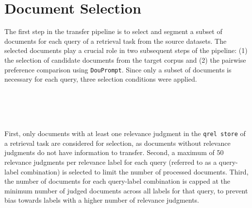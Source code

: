 \section{Document Selection}\label{eval-doucment-selection}

The first step in the transfer pipeline is to select and segment a subset of documents for each query of a retrieval task from the source datasets. The selected documents play a crucial role in two subsequent steps of the pipeline: (1) the selection of candidate documents from the target corpus and (2) the pairwise preference comparison using \texttt{DouPrompt}. Since only a subset of documents is necessary for each query, three selection conditions were applied.
\begin{table}[t]
  \centering
  \caption{The table presents the results of the candidate selection process, showing the minimum (min), maximum (max), and average (mean) number of documents per query for each source dataset. A maximum of 50 documents per query is possible.}
  \label{tab:document-selection}
\end{table}
\\\\\\\\
First, only documents with at least one relevance judgment in the \texttt{qrel store} of a retrieval task are considered for selection, as documents without relevance judgments do not have information to transfer. Second, a maximum of 50 relevance judgments per relevance label for each query (referred to as a query-label combination) is selected to limit the number of processed documents. Third, the number of documents for each query-label combination is capped at the minimum number of judged documents across all labels for that query, to prevent bias towards labels with a higher number of relevance judgments.
